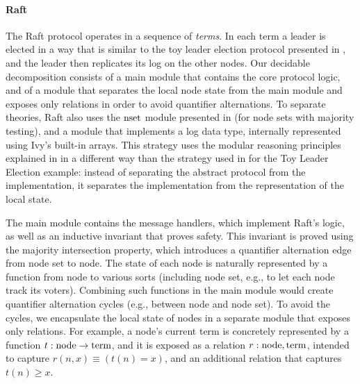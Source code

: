 \paragraph{Raft}
The Raft protocol operates in a sequence of \emph{terms}. In each term a leader
is elected in a way that is similar to the toy leader election protocol
presented in , and the leader then replicates its log on the
other nodes.
%
%
Our decidable decomposition consists of a main module that contains the core
protocol logic, and of a module that separates the local node state from the
main module and exposes only relations in order to avoid
quantifier alternations. To separate theories, Raft also uses the ${\text{nset}}$
module presented in  (for node sets with majority testing),
and a module that implements a log data type, internally represented using
Ivy's built-in arrays.  This strategy uses the modular reasoning principles
explained in  in a different way than the strategy used in
 for the Toy Leader Election example: instead of separating
the abstract protocol from the implementation, it separates the implementation
from the representation of the local state.


The main module contains the message handlers, which implement Raft's logic,
as well as an inductive invariant that proves safety. This invariant is proved
using the majority intersection property, which introduces a quantifier
alternation edge from node set to node. The state of each node is naturally
represented by a function from node to various sorts (including node set, e.g.,
to let each node track its voters). Combining such functions in the main module
would create quantifier alternation cycles (e.g., between node and node set).
To avoid the cycles, we encapsulate the local state of nodes in a separate module
that exposes only relations. For example, a node's current term is concretely
represented by a function $t : {\text{node}} \to {\text{term}}$, and it is exposed as a
relation $r : {\text{node}},{\text{term}}$,
intended to capture $r(n,x) \equiv (t(n) = x)$, and an additional relation that
captures $t(n) \geq x$.  

